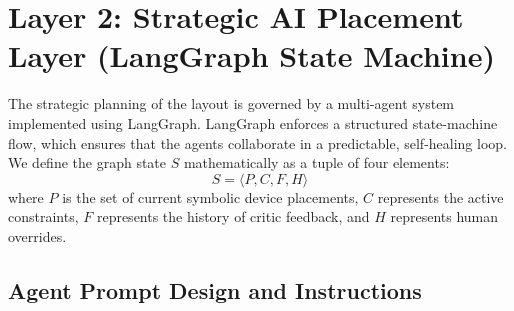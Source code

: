 \section[Layer 2: AI Placement]{Layer 2: Strategic AI Placement Layer (LangGraph State Machine)}
\label{sec:ai_layer}

The strategic planning of the layout is governed by a multi-agent system implemented using LangGraph. LangGraph enforces a structured state-machine flow, which ensures that the agents collaborate in a predictable, self-healing loop. We define the graph state $S$ mathematically as a tuple of four elements:
\begin{equation}
    S = \langle P, C, F, H \rangle
\end{equation}
where $P$ is the set of current symbolic device placements, $C$ represents the active constraints, $F$ represents the history of critic feedback, and $H$ represents human overrides.

\subsection{Agent Prompt Design and Instructions}

